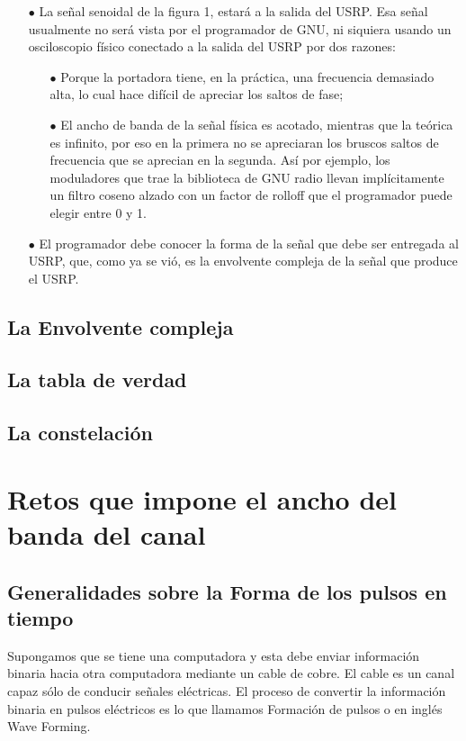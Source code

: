 \begin{itemize}
	\item [$\bullet$] La señal senoidal de la figura 1, estará a la salida del USRP. Esa señal usualmente no será vista por el programador de GNU, ni siquiera usando un osciloscopio físico conectado a la salida del USRP por dos razones: 
	\begin{itemize}
		\item [$\bullet$] Porque la portadora tiene, en la práctica, una frecuencia demasiado alta, lo cual hace difícil de apreciar los saltos de fase;
		
		\item [$\bullet$] El ancho de banda de la señal física es acotado, mientras que la teórica es infinito, por eso en la primera no se apreciaran los bruscos saltos de frecuencia que se aprecian en la segunda. Así por ejemplo, los moduladores que trae la biblioteca de GNU radio llevan implícitamente un filtro coseno alzado con un factor de rolloff que el programador puede elegir entre 0 y 1.
	\end{itemize}
	\item [$\bullet$] El programador debe conocer la forma de la señal que debe ser entregada al USRP, que, como ya se vió, es la envolvente compleja de la señal que produce el USRP. 
\end{itemize}

\subsection{La Envolvente compleja}

\subsection{La tabla de verdad}
\subsection{La constelación}


\section{Retos que impone el ancho del banda del canal}
\subsection{Generalidades sobre la Forma de los pulsos en tiempo}
Supongamos que se tiene una computadora y esta debe enviar información binaria hacia otra computadora mediante un cable de cobre. El cable es un canal capaz sólo de conducir señales eléctricas. El proceso de convertir la información binaria en pulsos eléctricos es lo que llamamos Formación de pulsos o en inglés Wave Forming. 

